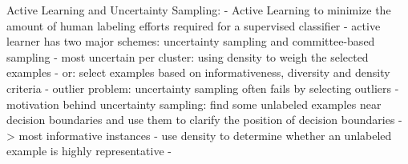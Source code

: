 Active Learning and Uncertainty Sampling: \cite{5272205}
- Active Learning to minimize the amount of human labeling efforts required for a supervised classifier
- active learner has two major schemes: uncertainty sampling and committee-based sampling
- most uncertain per cluster: using density to weigh the selected examples
- or: select examples based on informativeness, diversity and density criteria
- outlier problem: uncertainty sampling often fails by selecting outliers
- motivation behind uncertainty sampling: find some unlabeled examples near decision boundaries and use them to clarify the position of decision boundaries -> most informative instances
- use density to determine whether an unlabeled example is highly representative
- 











